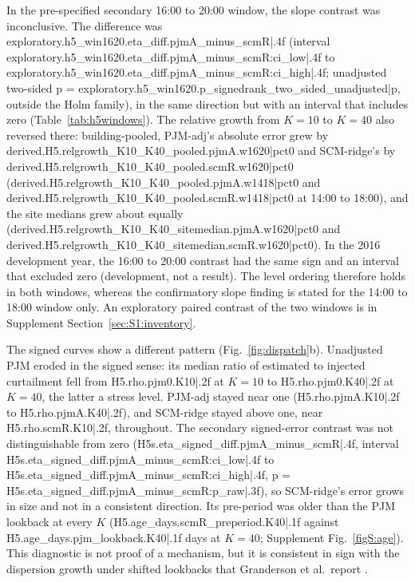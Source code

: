In the pre-specified secondary 16:00 to 20:00 window, the slope contrast was inconclusive. The difference was {{exploratory.h5_win1620.eta_diff.pjmA_minus_scmR|.4f}} (interval {{exploratory.h5_win1620.eta_diff.pjmA_minus_scmR:ci_low|.4f}} to {{exploratory.h5_win1620.eta_diff.pjmA_minus_scmR:ci_high|.4f}}; unadjusted two-sided p = {{exploratory.h5_win1620.p_signedrank_two_sided_unadjusted|p}}, outside the Holm family), in the same direction but with an interval that includes zero (Table~\ref{tab:h5windows}). The relative growth from $K=10$ to $K=40$ also reversed there: building-pooled, PJM-adj's absolute error grew by {{derived.H5.relgrowth_K10_K40_pooled.pjmA.w1620|pct0}} and SCM-ridge's by {{derived.H5.relgrowth_K10_K40_pooled.scmR.w1620|pct0}} ({{derived.H5.relgrowth_K10_K40_pooled.pjmA.w1418|pct0}} and {{derived.H5.relgrowth_K10_K40_pooled.scmR.w1418|pct0}} at 14:00 to 18:00), and the site medians grew about equally ({{derived.H5.relgrowth_K10_K40_sitemedian.pjmA.w1620|pct0}} and {{derived.H5.relgrowth_K10_K40_sitemedian.scmR.w1620|pct0}}). In the 2016 development year, the 16:00 to 20:00 contrast had the same sign and an interval that excluded zero (development, not a result). The level ordering therefore holds in both windows, whereas the confirmatory slope finding is stated for the 14:00 to 18:00 window only. An exploratory paired contrast of the two windows is in Supplement Section~\ref{sec:S1:inventory}.

The signed curves show a different pattern (Fig.~\ref{fig:dispatch}b). Unadjusted PJM eroded in the signed sense: its median ratio of estimated to injected curtailment fell from {{H5.rho.pjm0.K10|.2f}} at $K=10$ to {{H5.rho.pjm0.K40|.2f}} at $K=40$, the latter a stress level. PJM-adj stayed near one ({{H5.rho.pjmA.K10|.2f}} to {{H5.rho.pjmA.K40|.2f}}), and SCM-ridge stayed above one, near {{H5.rho.scmR.K10|.2f}}, throughout. The secondary signed-error contrast was not distinguishable from zero ({{H5s.eta_signed_diff.pjmA_minus_scmR|.4f}}, interval {{H5s.eta_signed_diff.pjmA_minus_scmR:ci_low|.4f}} to {{H5s.eta_signed_diff.pjmA_minus_scmR:ci_high|.4f}}, p = {{H5s.eta_signed_diff.pjmA_minus_scmR:p_raw|.3f}}), so SCM-ridge's error grows in size and not in a consistent direction. Its pre-period was older than the PJM lookback at every $K$ ({{H5.age_days.scmR_preperiod.K40|.1f}} against {{H5.age_days.pjm_lookback.K40|.1f}} days at $K=40$; Supplement Fig.~\ref{figS:age}). This diagnostic is not proof of a mechanism, but it is consistent in sign with the dispersion growth under shifted lookbacks that Granderson et al.\ report \cite{granderson2023}.

